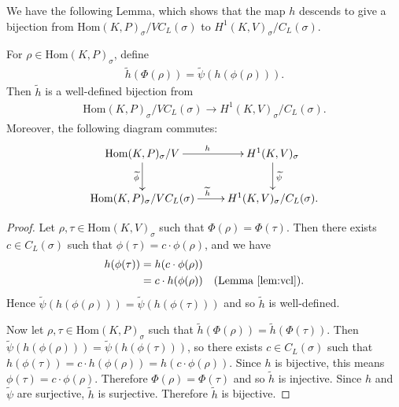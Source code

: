 	We have the following Lemma, which shows that the map $h$ descends to give a bijection from $\mathrm{Hom}(K, P)_\sigma /VC_L(\sigma)$ to $H^1(K, V)_{\sigma}/C_L(\sigma)$.

\begin{lemma}
	For $\rho \in \mathrm{Hom}(K, P)_\sigma$, define
	\begin{align*}
		\widetilde{h}(\Phi(\rho)) = \widetilde{\psi}(h(\phi(\rho))).
	\end{align*}
	Then $\widetilde{h}$ is a well-defined bijection from
	\begin{align*}
		\mathrm{Hom}(K, P)_\sigma / VC_L(\sigma) \rightarrow H^1(K, V)_\sigma/C_L(\sigma).
	\end{align*}
	Moreover, the following diagram commutes:
  \begin{align*}
    \xymatrix{
		\mathrm{Hom}(K, P)_{\sigma}/V \ar[r]^h \ar[d]_{\widetilde{\phi}} & H^{1}(K, V)_\sigma \ar[d]^{\widetilde{\psi}} \\
		\mathrm{Hom}(K, P)_{\sigma}/VC_L(\sigma) \ar[r]^{\widetilde{h}} & H^{1}(K, V)_\sigma/C_L(\sigma).
    }
  \end{align*}
\end{lemma}
\begin{proof}
Let $\rho, \tau \in \mathrm{Hom}(K, V)_\sigma$ such that $\Phi(\rho) = \Phi(\tau)$. Then there exists $c \in C_L(\sigma)$ such that $\phi(\tau) = c\cdot\phi(\rho)$, and we have
\begin{align*}
	h(\phi(\tau)) &= h(c \cdot\phi(\rho)) \\
	&= c \cdot h(\phi(\rho))\quad(\textrm{Lemma }\ref{lem:vcl}). 
\end{align*}
Hence $\widetilde{\psi}(h(\phi(\rho))) = \widetilde{\psi}(h(\phi(\tau)))$ and so $\widetilde{h}$ is well-defined.

Now let $\rho, \tau\in \mathrm{Hom}(K, P)_\sigma$ such that $\widetilde{h}\left(\Phi(\rho)\right) = \widetilde{h}\left(\Phi(\tau)\right)$. Then $\widetilde{\psi}(h(\phi(\rho))) = \widetilde{\psi}(h(\phi(\tau)))$, so there exists $c\in C_L(\sigma)$ such that $h(\phi(\tau)) = c\cdot h(\phi(\rho)) = h(c\cdot\phi(\rho))$. Since $h$ is bijective, this means $\phi(\tau) = c\cdot\phi(\rho)$. Therefore $\Phi(\rho) = \Phi(\tau)$ and so $\widetilde{h}$ is injective. Since $h$ and $\widetilde{\psi}$ are surjective, $\widetilde{h}$ is surjective. Therefore $\widetilde{h}$ is bijective.
\end{proof}

